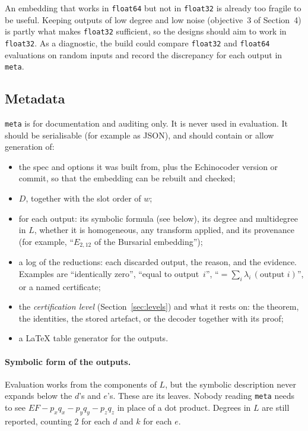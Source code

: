 \documentclass[11pt]{article}
\theoremstyle{definition}
\theoremstyle{remark}
\begin{document}
An embedding that works in \texttt{float64} but not in \texttt{float32} is
already too fragile to be useful. Keeping outputs of low degree and low noise
(objective~3 of Section~4) is partly what makes \texttt{float32}
sufficient, so the designs should aim to work in \texttt{float32}. As a
diagnostic, the build could compare \texttt{float32} and \texttt{float64}
evaluations on random inputs and record the discrepancy for each output in
\texttt{meta}.

\subsection{Metadata}

\texttt{meta} is for documentation and auditing only. It is never used in
evaluation. It should be serialisable (for example as JSON), and should
contain or allow generation of:
\begin{itemize}
  \item the spec and options it was built from, plus the Echinocoder
    version or commit, so that the embedding can be rebuilt and checked;
  \item $D$, together with the slot order of $w$;
  \item for each output: its symbolic formula (see below), its degree and
    multidegree in $L$, whether it is homogeneous, any transform applied, and
    its provenance (for example, ``$E_{2,12}$ of the Bursarial embedding'');
  \item a log of the reductions: each discarded output, the reason, and the
    evidence. Examples are ``identically zero'', ``equal to output~$i$'',
    ``$= \sum_i \lambda_i\,(\text{output } i)$'', or a named certificate;
  \item the \emph{certification level} (Section~\ref{sec:levels}) and what it
    rests on: the theorem, the identities, the stored artefact, or the decoder
    together with its proof;
  \item a LaTeX table generator for the outputs.
\end{itemize}

\paragraph{Symbolic form of the outputs.}
Evaluation works from the components of $L$, but the symbolic description
never expands below the $d$'s and $e$'s. These are its leaves. Nobody reading
\texttt{meta} needs to see $E F - p_x q_x - p_y q_y - p_z q_z$ in place of a
dot product. Degrees in $L$ are still reported, counting $2$ for each $d$ and
$k$ for each $e$.
\end{document}
